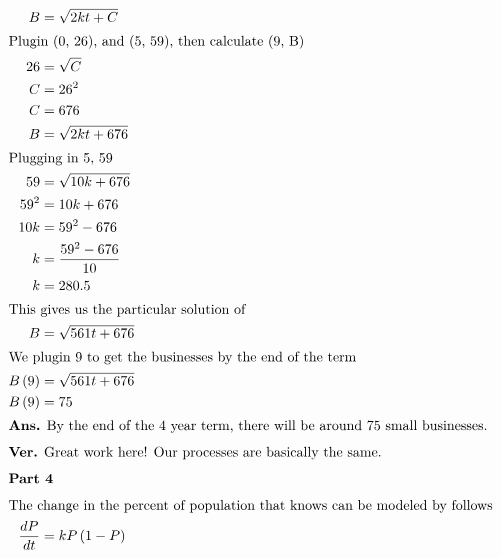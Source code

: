 \documentclass[12pt]{article}
\begin{document}
\begin{align}
  B                                           & =\sqrt{2kt+C}                                              \\
  \intertext{Plugin (0, 26), and (5, 59), then calculate (9, B)}
  26                                          & =\sqrt{C}                                                  \\
  C                                           & =26^{2}                                                    \\
  C                                           & =676                                                       \\
  B                                           & =\sqrt{2kt+676}                                            \\
  \intertext{Plugging in 5, 59}
  59                                          & =\sqrt{10k+676}                                            \\
  59^{2}                                      & =10k+676                                                   \\
  10k                                         & =59^{2}-676                                                \\
  k                                           & =\frac{59^{2}-676}{10}                                     \\
  k                                           & =280.5                                                     \\
  \intertext{This gives us the particular solution of }
  B                                           & =\sqrt{561t+676}                                           \\
  \intertext{We plugin 9 to get the businesses by the end of the term}
  B\left(9\right)                             & =\sqrt{561t+676}                                           \\
  B\left(9\right)                             & =75                                                        \\
  \intertext{\textbf{Ans.} By the end of the 4 year term, there will be around $75$ small businesses.}
  \intertext{\textbf{Ver.} Great work here! Our processes are basically the same.}
  \intertext{\textbf{Part 4}}
  \intertext{The change in the percent of population that knows can be modeled by follows}
  \frac{dP}{dt}                               & =kP\left(1-P\right)                                        \\

\end{align}
\end{document}

